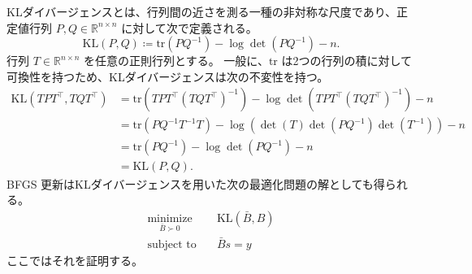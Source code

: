 \documentclass[0_main]{subfiles}
\begin{document}
KLダイバージェンスとは、行列間の近さを測る一種の非対称な尺度であり、正定値行列 $P,Q \in \mathbb{R}^{n \times n}$ に対して次で定義される。
\begin{equation*}
    \mathrm{KL}(P,Q) \coloneqq \mathrm{tr}(P Q^{-1}) - \log\det(P Q^{-1}) - n.
\end{equation*}
行列 $T \in \mathbb{R}^{n \times n}$ を任意の正則行列とする。
一般に、$\mathrm{tr}$ は2つの行列の積に対して可換性を持つため、KLダイバージェンスは次の不変性を持つ。
\begin{align*}
    \mathrm{KL}(T P T^\top, T Q T^\top) & = \mathrm{tr}(T P T^\top (T Q T^\top)^{-1}) - \log\det(T P T^\top (T Q T^\top)^{-1}) - n \\
                                        & = \mathrm{tr}(P Q^{-1} T^{-1} T) - \log (\det(T) \det(P Q^{-1}) \det(T^{-1})) - n        \\
                                        & = \mathrm{tr}(P Q^{-1}) - \log\det(P Q^{-1}) - n                                         \\
                                        & = \mathrm{KL}(P, Q).
\end{align*}
BFGS 更新はKLダイバージェンスを用いた次の最適化問題の解としても得られる。
\begin{align*}
    \underset{\bar{B} \succ 0}{\text{minimize}} & \quad \mathrm{KL}(\bar{B}, B) \\
    \text{subject to}                           & \quad \bar{B} s = y
\end{align*}
ここではそれを証明する。
\end{document}
